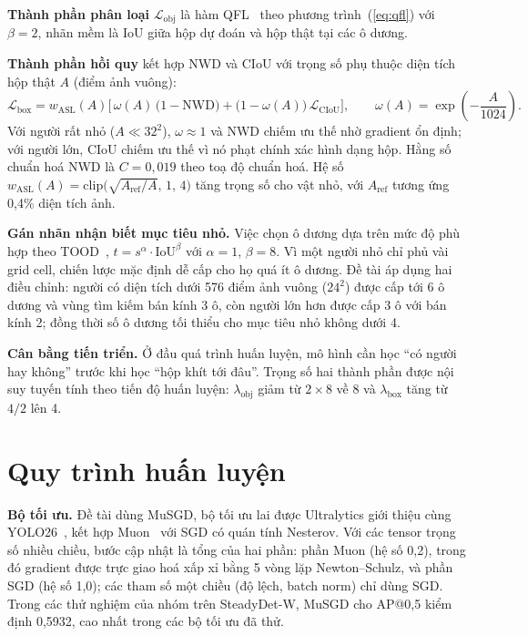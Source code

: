 \textbf{Thành phần phân loại} $\mathcal{L}_{\text{obj}}$ là hàm QFL~\cite{li2020gfl} theo phương trình~(\ref{eq:qfl}) với $\beta = 2$, nhãn mềm là IoU giữa hộp dự đoán và hộp thật tại các ô dương.

\textbf{Thành phần hồi quy} kết hợp NWD và CIoU với trọng số phụ thuộc diện tích hộp thật $A$ (điểm ảnh vuông):
\begin{equation}
\mathcal{L}_{\text{box}} = w_{\text{ASL}}(A)\Big[\, \omega(A)\,\big(1 - \mathrm{NWD}\big) + \big(1 - \omega(A)\big)\,\mathcal{L}_{\mathrm{CIoU}} \Big],
\qquad \omega(A) = \exp\!\left(-\frac{A}{1024}\right).
\label{eq:boxloss}
\end{equation}
Với người rất nhỏ ($A \ll 32^2$), $\omega \approx 1$ và NWD chiếm ưu thế nhờ gradient ổn định; với người lớn, CIoU chiếm ưu thế vì nó phạt chính xác hình dạng hộp. Hằng số chuẩn hoá NWD là $C = 0{,}019$ theo toạ độ chuẩn hoá. Hệ số $w_{\text{ASL}}(A) = \mathrm{clip}\big(\sqrt{A_{\text{ref}}/A},\, 1,\, 4\big)$ tăng trọng số cho vật nhỏ, với $A_{\text{ref}}$ tương ứng 0,4\% diện tích ảnh.

\textbf{Gán nhãn nhận biết mục tiêu nhỏ.} Việc chọn ô dương dựa trên mức độ phù hợp theo TOOD~\cite{feng2021tood}, $t = s^{\alpha}\cdot \mathrm{IoU}^{\beta}$ với $\alpha = 1$, $\beta = 8$. Vì một người nhỏ chỉ phủ vài grid cell, chiến lược mặc định dễ cấp cho họ quá ít ô dương. Đề tài áp dụng hai điều chỉnh: người có diện tích dưới 576 điểm ảnh vuông ($24^2$) được cấp tới 6 ô dương và vùng tìm kiếm bán kính 3 ô, còn người lớn hơn được cấp 3 ô với bán kính 2; đồng thời số ô dương tối thiểu cho mục tiêu nhỏ không dưới 4.

\textbf{Cân bằng tiến triển.} Ở đầu quá trình huấn luyện, mô hình cần học ``có người hay không'' trước khi học ``hộp khít tới đâu''. Trọng số hai thành phần được nội suy tuyến tính theo tiến độ huấn luyện: $\lambda_{\text{obj}}$ giảm từ $2\times8$ về 8 và $\lambda_{\text{box}}$ tăng từ $4/2$ lên 4.

\section{Quy trình huấn luyện}
\label{sec:quytrinhhuanluyen}

\textbf{Bộ tối ưu.} Đề tài dùng MuSGD, bộ tối ưu lai được Ultralytics giới thiệu cùng YOLO26~\cite{ultralytics}, kết hợp Muon~\cite{jordan2024muon} với SGD có quán tính Nesterov. Với các tensor trọng số nhiều chiều, bước cập nhật là tổng của hai phần: phần Muon (hệ số 0,2), trong đó gradient được trực giao hoá xấp xỉ bằng 5 vòng lặp Newton--Schulz, và phần SGD (hệ số 1,0); các tham số một chiều (độ lệch, batch norm) chỉ dùng SGD. Trong các thử nghiệm của nhóm trên SteadyDet-W, MuSGD cho AP@0,5 kiểm định 0,5932, cao nhất trong các bộ tối ưu đã thử.

